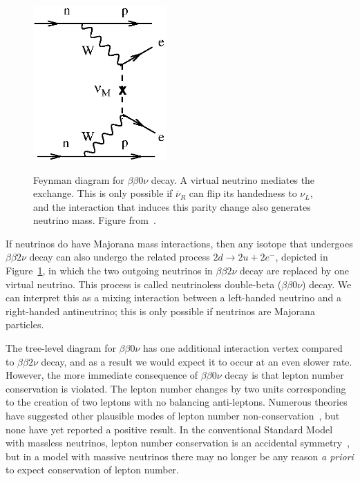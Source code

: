 \begin{figure}
\begin{center}
\includegraphics[keepaspectratio=true,width=2in]{Avignone_fig02b.eps}
\end{center}
\renewcommand{\baselinestretch}{1}
\small\normalsize
\begin{quote}
\caption{Feynman diagram for $\beta\beta 0 \nu$ decay.  A virtual neutrino mediates the exchange.  This is only possible if $\overline{\nu}_R$ can flip its handedness to $\nu_L$, and the interaction that induces this parity change also generates neutrino mass.  Figure from~\cite{RMPbb0n}.}
\label{fig:FeynmanBetaBeta0Nu}
\end{quote}
\end{figure}
\renewcommand{\baselinestretch}{2}
\small\normalsize

If neutrinos do have Majorana mass interactions, then any isotope that undergoes $\beta\beta 2\nu$ decay can also undergo the related process $2d \rightarrow 2u + 2e^-$, depicted in Figure~\ref{fig:FeynmanBetaBeta0Nu}, in which the two outgoing neutrinos in $\beta\beta 2\nu$ decay are replaced by one virtual neutrino.  This process is called neutrinoless double-beta ($\beta\beta 0\nu$) decay.  We can interpret this as a mixing interaction between a left-handed neutrino and a right-handed antineutrino; this is only possible if neutrinos are Majorana particles.

The tree-level diagram for $\beta\beta 0\nu$ has one additional interaction vertex compared to $\beta\beta 2\nu$ decay, and as a result we would expect it to occur at an even slower rate.  However, the more immediate consequence of $\beta\beta 0\nu$ decay is that lepton number conservation is violated.  The lepton number changes by two units corresponding to the creation of two leptons with no balancing anti-leptons.  Numerous theories have suggested other plausible modes of lepton number non-conservation~\cite{ProtonDecay,MuonToPositron}, but none have yet reported a positive result.  In the conventional Standard Model with massless neutrinos, lepton number conservation is an accidental symmetry~\cite{LeptonConservation}, but in a model with massive neutrinos there may no longer be any reason \textit{a priori} to expect conservation of lepton number.

